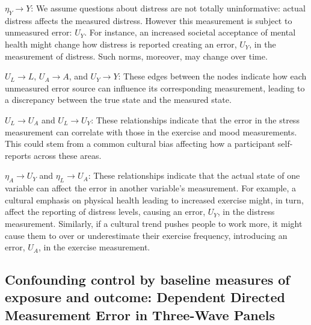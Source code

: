 \documentclass[
  singlecolumn]{report}
\begin{document}
\(\eta_Y \rightarrow Y\): We assume questions about distress are not
totally uninformative: actual distress affects the measured distress.
However this measurement is subject to unmeasured error: \(U_{Y}\). For
instance, an increased societal acceptance of mental health might change
how distress is reported creating an error, \(U_{Y}\), in the
measurement of distress. Such norms, moreover, may change over time.

\(U_{L} \rightarrow L\), \(U_{A} \rightarrow A\), and
\(U_{Y} \rightarrow Y\): These edges between the nodes indicate how each
unmeasured error source can influence its corresponding measurement,
leading to a discrepancy between the true state and the measured state.

\(U_{L} \rightarrow U_{A}\) and \(U_{L} \rightarrow U_{Y}\): These
relationships indicate that the error in the stress measurement can
correlate with those in the exercise and mood measurements. This could
stem from a common cultural bias affecting how a participant
self-reports across these areas.

\(\eta_A \rightarrow U_{Y}\) and \(\eta_L \rightarrow U_{A}\): These
relationships indicate that the actual state of one variable can affect
the error in another variable's measurement. For example, a cultural
emphasis on physical health leading to increased exercise might, in
turn, affect the reporting of distress levels, causing an error,
\(U_{Y}\), in the distress measurement. Similarly, if a cultural trend
pushes people to work more, it might cause them to over or underestimate
their exercise frequency, introducing an error, \(U_{A}\), in the
exercise measurement.

\hypertarget{confounding-control-by-baseline-measures-of-exposure-and-outcome-dependent-directed-measurement-error-in-three-wave-panels}{%
\subsection{Confounding control by baseline measures of exposure and
outcome: Dependent Directed Measurement Error in Three-Wave
Panels}\label{confounding-control-by-baseline-measures-of-exposure-and-outcome-dependent-directed-measurement-error-in-three-wave-panels}}
\end{document}

